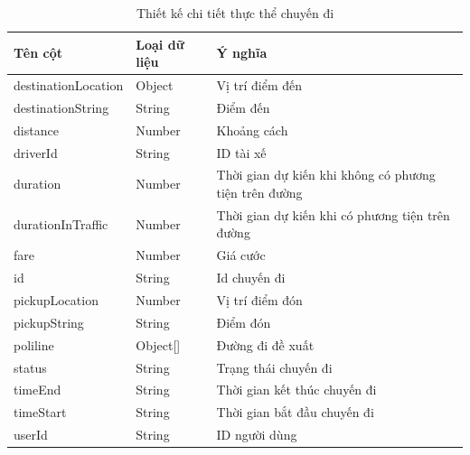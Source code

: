 \documentclass[../DoAn.tex]{subfiles}
\begin{document}
\begin{table}[H]
    \centering
    \begin{tabular}{|l|l|l|}
    \hline
    \textbf{Tên cột}    & \textbf{Loại dữ liệu} & \textbf{Ý nghĩa}                                      \\ \hline
    destinationLocation & Object                & Vị trí điểm đến                                       \\ \hline
    destinationString   & String                & Điểm đến                                              \\ \hline
    distance            & Number                & Khoảng cách                                           \\ \hline
    driverId            & String                & ID tài xế                                             \\ \hline
    duration            & Number                & Thời gian dự kiến khi không có phương tiện trên đường \\ \hline
    durationInTraffic   & Number                & Thời gian dự kiến khi có phương tiện trên đường       \\ \hline
    fare                & Number                & Giá cước                                              \\ \hline
    id                  & String                & Id chuyến đi                                          \\ \hline
    pickupLocation      & Number                & Vị trí điểm đón                                       \\ \hline
    pickupString        & String                & Điểm đón                                              \\ \hline
    poliline            & Object[]              & Đường đi đề xuất                                      \\ \hline
    status              & String                & Trạng thái chuyến đi                                  \\ \hline
    timeEnd             & String                & Thời gian kết thúc chuyến đi                          \\ \hline
    timeStart           & String                & Thời gian bắt đầu chuyến đi                           \\ \hline
    userId              & String                & ID người dùng                                         \\ \hline
    \end{tabular}
    \caption{Thiết kế chi tiết thực thể chuyến đi}
    \label{table:Thiết_kế_chi_tiết_thực_thể_chuyến_đi}
\end{table}
\end{document}

